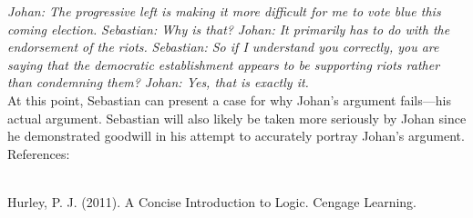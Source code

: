 \documentclass[a4paper,12pt,single,pdftex]{scrartcl}
\begin{document}
    
      {\em Johan: The progressive left is making it more difficult for me to vote blue this coming election.} \newline
{\em Sebastian: Why is that?} \newline
{\em Johan: It primarily has to do with the endorsement of the riots.} \newline
{\em Sebastian: So if I understand you correctly, you are saying that the democratic establishment appears to be supporting riots rather than condemning them?} \newline
{\em Johan: Yes, that is exactly it.}
    \\

    
      At this point, Sebastian can present a case for why Johan’s argument fails—his actual argument. Sebastian will also likely be taken more seriously by Johan since he demonstrated goodwill in his attempt to accurately portray Johan’s argument.
    \\

    References:

    
      
        
      \\

      
        Hurley, P. J. (2011). A Concise Introduction to Logic. Cengage Learning.
      \\

    
\end{document}
